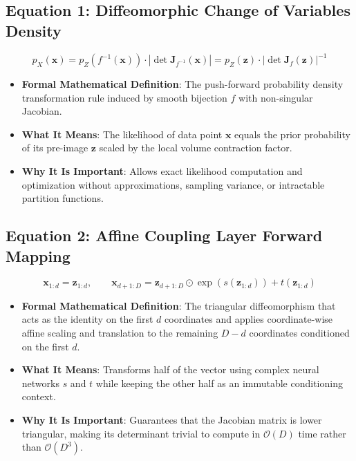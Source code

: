 \documentclass[11pt,a4paper]{article}
\theoremstyle{definition}
\begin{document}
\subsection{\textbf{Equation 1: Diffeomorphic Change of Variables Density}}
{\boldmath
\begin{equation}
p_X(\mathbf{x}) = p_Z(f^{-1}(\mathbf{x})) \cdot \left| \det \mathbf{J}_{f^{-1}}(\mathbf{x}) \right| = p_Z(\mathbf{z}) \cdot \left| \det \mathbf{J}_f(\mathbf{z}) \right|^{-1}
\end{equation}
}
\begin{itemize}
    \item \textbf{Formal Mathematical Definition}:
    The push-forward probability density transformation rule induced by smooth bijection $f$ with non-singular Jacobian.
    \item \textbf{What It Means}:
    The likelihood of data point $\mathbf{x}$ equals the prior probability of its pre-image $\mathbf{z}$ scaled by the local volume contraction factor.
    \item \textbf{Why It Is Important}:
    Allows exact likelihood computation and optimization without approximations, sampling variance, or intractable partition functions.
\end{itemize}

\subsection{\textbf{Equation 2: Affine Coupling Layer Forward Mapping}}
{\boldmath
\begin{equation}
\mathbf{x}_{1:d} = \mathbf{z}_{1:d}, \qquad \mathbf{x}_{d+1:D} = \mathbf{z}_{d+1:D} \odot \exp(s(\mathbf{z}_{1:d})) + t(\mathbf{z}_{1:d})
\end{equation}
}
\begin{itemize}
    \item \textbf{Formal Mathematical Definition}:
    The triangular diffeomorphism that acts as the identity on the first $d$ coordinates and applies coordinate-wise affine scaling and translation to the remaining $D - d$ coordinates conditioned on the first $d$.
    \item \textbf{What It Means}:
    Transforms half of the vector using complex neural networks $s$ and $t$ while keeping the other half as an immutable conditioning context.
    \item \textbf{Why It Is Important}:
    Guarantees that the Jacobian matrix is lower triangular, making its determinant trivial to compute in $\mathcal{O}(D)$ time rather than $\mathcal{O}(D^3)$.
\end{itemize}
\end{document}
